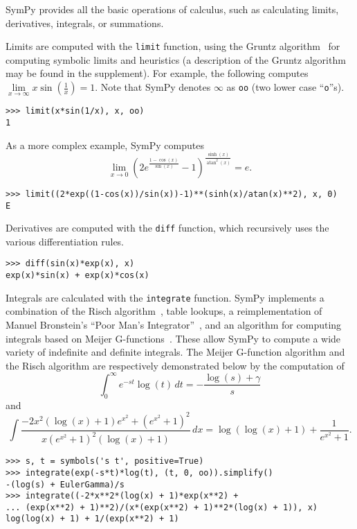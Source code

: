 SymPy provides all the basic operations of calculus, such as calculating
limits, derivatives, integrals, or summations.

Limits are computed with the \verb|limit| function, using the Gruntz
algorithm~\cite{Gruntz1996limits} for computing symbolic limits and heuristics (a description of the Gruntz algorithm may be found in the supplement).
For example, the following computes
$\lim\limits_{x\to \infty} x\sin(\frac{1}{x})=1$. Note that SymPy denotes
$\infty$ as \verb|oo| (two lower case ``\verb|o|''s).
\begin{verbatim}
>>> limit(x*sin(1/x), x, oo)
1
\end{verbatim}
As a more complex example, SymPy computes \[\lim\limits_{x\to 0}{\left(2 e^{\frac{1 - \cos{\left (x \right )}}{\sin{\left (x \right )}}} -
  1\right)}^{\frac{\sinh{\left (x \right )}}{\operatorname{atan}^{2}{\left (x
      \right )}}} = e.\]
\begin{verbatim}
>>> limit((2*exp((1-cos(x))/sin(x))-1)**(sinh(x)/atan(x)**2), x, 0)
E
\end{verbatim}

Derivatives are computed with the \verb|diff| function, which recursively uses
the various differentiation rules.
\begin{verbatim}
>>> diff(sin(x)*exp(x), x)
exp(x)*sin(x) + exp(x)*cos(x)
\end{verbatim}

Integrals are calculated with the \verb|integrate| function. SymPy
implements a combination of the Risch
algorithm~\cite{bronstein2005integration}, table lookups, a reimplementation
of Manuel Bronstein's ``Poor Man's Integrator''~\cite{Bronstein2005pmint}, and
an algorithm for computing integrals based on Meijer G-functions~\cite{Roach1996hyper,roach1997meijerg}. These allow
SymPy to compute a wide variety of indefinite and definite integrals. The
Meijer G-function algorithm and the Risch algorithm are respectively
demonstrated below by the computation of \[\int_{0}^{\infty} e^{-s t}\log{\left (t \right )}\, dt = - \frac{ \log{\left (s \right )} + \gamma}{s}\] and \[\int \frac{- 2 x^{2} \left(\log{\left (x \right )} + 1\right) e^{x^{2}} + {\left(e^{x^{2}} + 1\right)}^{2}}{x {\left(e^{x^{2}} + 1\right)}^{2} \left(\log{\left (x \right )} + 1\right)}\, dx = \log{\left (\log{\left (x \right )} + 1 \right )} + \frac{1}{e^{x^{2}} + 1}.\]
\begin{verbatim}
>>> s, t = symbols('s t', positive=True)
>>> integrate(exp(-s*t)*log(t), (t, 0, oo)).simplify()
-(log(s) + EulerGamma)/s
>>> integrate((-2*x**2*(log(x) + 1)*exp(x**2) +
... (exp(x**2) + 1)**2)/(x*(exp(x**2) + 1)**2*(log(x) + 1)), x)
log(log(x) + 1) + 1/(exp(x**2) + 1)
\end{verbatim}

